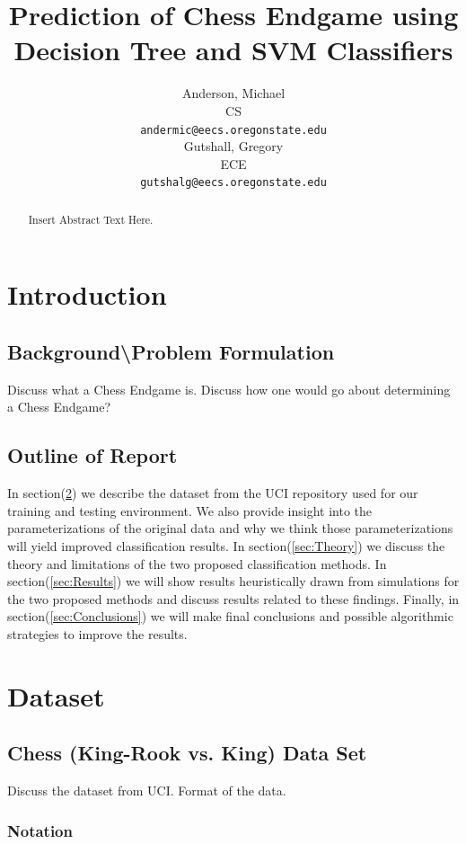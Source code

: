 \documentclass[fleqn]{article}
\title{Prediction of Chess Endgame using\\
Decision Tree and SVM Classifiers}
\author{
Anderson, Michael\\
CS\\ 
\texttt{andermic@eecs.oregonstate.edu} \\
\AND
Gutshall, Gregory\\
ECE\\
\texttt{gutshalg@eecs.oregonstate.edu} \\
}
\begin{document}
\maketitle

\begin{abstract}
Insert Abstract Text Here.
\end{abstract}

\section{Introduction}
\label{sec:Intro}
%
\subsection[Background]{Background\textbackslash Problem Formulation}
\label{subsec:Background}
Discuss what a Chess Endgame is.  Discuss how one would go about determining a Chess Endgame?  
%
\subsection{Outline of Report}
\label{subsec:outline}
In section(\ref{sec:Dataset}) we describe the dataset from the UCI repository used for our training and testing environment.  We also provide insight into the parameterizations of the original data and why we think those parameterizations will yield improved classification results.  In section(\ref{sec:Theory}) we discuss the theory and limitations of the two proposed classification methods.  In section(\ref{sec:Results}) we will show results heuristically drawn from simulations for the two proposed methods and discuss results related to these findings.  Finally, in section(\ref{sec:Conclusions}) we will make final conclusions and possible algorithmic strategies to improve the results. 

\section{Dataset}
\label{sec:Dataset}

\subsection{Chess (King-Rook vs. King) Data Set}
\label{subsec:dataset}
Discuss the dataset from UCI.  Format of the data.

\subsubsection{Notation}
\end{document}
